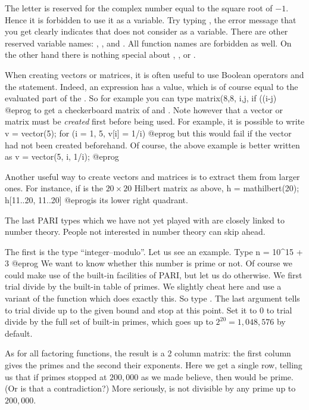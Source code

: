  The letter  is reserved for the complex number
equal to the square root of $-1$. Hence it is forbidden to use it as a
variable. Try typing , the error message that you
get clearly indicates that  does not consider  as a variable.
There are other reserved variable names: , ,
 and . All function names are forbidden as well. On the
other hand there is nothing special about , ,  or
.

When creating vectors or matrices, it is often useful to use Boolean
operators and the  statement. Indeed, an  expression has a
value, which is of course equal to the evaluated part of the . So for
example you can type
\bprog
  matrix(8,8, i,j, if ((i-j)%
@eprog\noindent
to get a checkerboard matrix of  and . Note however
that a vector or matrix must be \emph{created} first before being used. For
example, it is possible to write
\bprog
  v = vector(5);
  for (i = 1, 5, v[i] = 1/i)
@eprog\noindent
but this would fail if the vector  had not been created beforehand.
Of course, the above example is better written as
\bprog
  v = vector(5, i, 1/i);
@eprog

Another useful way to create vectors and matrices is to extract them from
larger ones. For instance, if  is the $20\times 20$ Hilbert matrix as above,
\bprog
  h = mathilbert(20);
  h[11..20, 11..20]
@eprog\noindent is its lower right quadrant.

\medskip The last PARI types which we have not yet played with are closely
linked to number theory. People not interested in number theory can skip
ahead.

The first is the type ``integer--modulo''. Let us see an example. Type
\bprog
  n = 10^15 + 3
@eprog
We want to know whether this number is prime or not. Of course we could make
use of the built-in facilities of PARI, but let us do otherwise. We first
trial divide by the built-in table of primes. We slightly cheat here and use
a variant of the function  which does exactly this. So type
. The last argument tells  to trial divide
up to the given bound and stop at this point. Set it to 0 to trial divide by
the full set of built-in primes, which goes up to $2^{20} = 1,048,576$ by
default.

As for all factoring functions, the result is a 2 column matrix: the first
column gives the primes and the second their exponents. Here we get a single
row, telling us that if primes stopped at $200,000$ as we made 
believe, then  would be prime. (Or is that a contradiction?) More
seriously,  is not divisible by any prime up to $200,000$.

